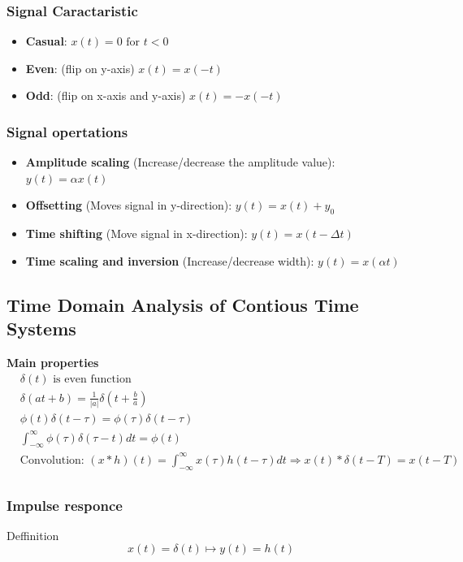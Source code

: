 \documentclass{article}
\begin{document}
\subsubsection{Signal Caractaristic}
\begin{itemize}
    \item \textbf{Casual}: $x(t)=0 \text{ for } t<0$
    \item \textbf{Even}: (flip on y-axis) $x(t)=x(-t)$
    \item \textbf{Odd}: (flip on x-axis and y-axis) $x(t)=-x(-t)$
\end{itemize}


\subsubsection{Signal opertations}
\begin{itemize}
    \item \textbf{Amplitude scaling} (Increase/decrease the amplitude value): $y(t)=\alpha x(t)$
    \item \textbf{Offsetting} (Moves signal in y-direction): $y(t)=x(t)+y_0$
    \item \textbf{Time shifting} (Move signal in x-direction): $y(t)=x(t-\Delta t)$
    \item \textbf{Time scaling and inversion} (Increase/decrease width): $y(t) = x(\alpha t)$
\end{itemize}


\subsection{Time Domain Analysis of Contious Time Systems}
\textbf{Main properties}
\begin{align*}
    &\delta(t) \text{ is even function} \\
    &\delta(at+b) = \frac{1}{|a|}\delta(t+\frac{b}{a}) \\
    &\phi(t)\delta(t-\tau) = \phi(\tau)\delta(t-\tau) \\
    &\int_{-\infty}^{\infty}\phi(\tau)\delta(\tau-t)dt = \phi(t) \\
    &\text{Convolution: } (x*h)(t) = \int_{-\infty}^{\infty}x(\tau)h(t-\tau)dt 
    \Rightarrow x(t)*\delta(t-T)=x(t-T) \\
\end{align*}

\subsubsection{Impulse responce}
Deffinition
\begin{equation*}
    x(t)=\delta(t) \mapsto y(t)=h(t)
\end{equation*}
\end{document}
